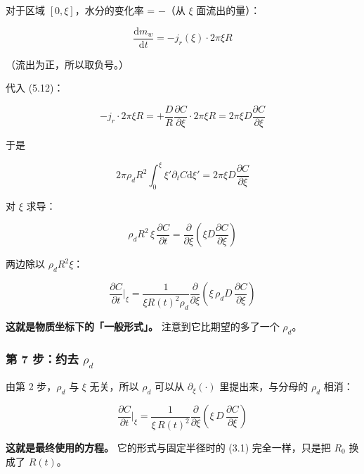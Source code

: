 对于区域 $[0,\xi]$，水分的变化率 = $-$（从 $\xi$ 面流出的量）：


\begin{equation}
\frac{\mathrm{d} m_w}{\mathrm{d} t}=-j_r(\xi)\cdot2\pi\xi R\tag{5.10'}
\end{equation}


（流出为正，所以取负号。）


代入 (5.12)：


\begin{equation}
-j_r\cdot2\pi\xi R=+\frac{D}{R}\frac{\partial C}{\partial\xi}\cdot2\pi\xi R=2\pi\xi D\frac{\partial C}{\partial\xi}\tag{5.14'}
\end{equation}


于是


\begin{equation*}
2\pi\rho_dR^2\int_0^{\xi}\xi'\partial_tC\mathrm{d}\xi'=2\pi\xi D\frac{\partial C}{\partial\xi}
\end{equation*}


对 $\xi$ 求导：


\begin{equation*}
\rho_dR^2\,\xi\,\frac{\partial C}{\partial t}=\frac{\partial}{\partial\xi}\left(\xi D\frac{\partial C}{\partial\xi}\right)
\end{equation*}


两边除以 $\rho_dR^2\xi$：


\begin{equation}
\frac{\partial C}{\partial t}\bigg|_{\xi}=\frac{1}{\xi R(t)^2\rho_d}\frac{\partial}{\partial \xi}\left(\xi\,\rho_d D\,\frac{\partial C}{\partial \xi}\right)\tag{5.17}
\end{equation}


\textbf{这就是物质坐标下的「一般形式」。} 注意到它比期望的多了一个 $\rho_d$。


\subsubsection{第 7 步：约去 $\rho_d$}


由第 2 步，$\rho_d$ 与 $\xi$ 无关，所以 $\rho_d$ 可以从 $\partial_\xi(\cdot)$ 里提出来，与分母的 $\rho_d$ 相消：


\begin{equation}
\boxed{\ \frac{\partial C}{\partial t}\bigg|_{\xi}=\frac{1}{\xi\,R(t)^2}\frac{\partial}{\partial \xi}\left(\xi\,D\,\frac{\partial C}{\partial \xi}\right)\ }\tag{5.18}
\end{equation}


\textbf{这就是最终使用的方程。} 它的形式与固定半径时的 (3.1) 完全一样，只是把 $R_0$ 换成了 $R(t)$。


